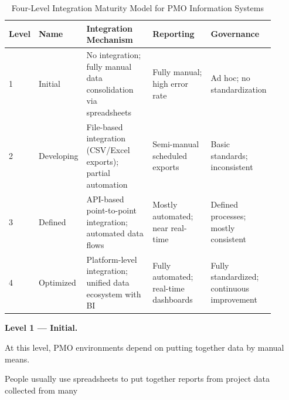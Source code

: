 {\singlespacing 

\begin{table}[h] 

  \caption{Four-Level Integration Maturity Model for PMO Information Systems} 

  \label{tab:imm-levels} 

  \centering 

  \begin{tabular}{p{0.08\linewidth}p{0.15\linewidth}p{0.25\linewidth}p{0.22\linewidth}p{0.20\linewidth}} 

    \toprule 

    \textbf{Level} & \textbf{Name} & \textbf{Integration Mechanism} &  

    \textbf{Reporting} & \textbf{Governance}\\ 

    \midrule 

    1 & Initial & No integration; fully manual data consolidation via spreadsheets &  

    Fully manual; high error rate & Ad hoc; no standardization\\ 

    2 & Developing & File-based integration (CSV/Excel exports); partial automation &  

    Semi-manual scheduled exports & Basic standards; inconsistent\\ 

    3 & Defined & API-based point-to-point integration; automated data flows &  

    Mostly automated; near real-time & Defined processes; mostly consistent\\ 

    4 & Optimized & Platform-level integration; unified data ecosystem with BI &  

    Fully automated; real-time dashboards & Fully standardized; continuous improvement\\ 

    \bottomrule 

  \end{tabular} 

\end{table} 

} 

\textbf{Level 1 --- Initial.}  

At this level, PMO environments depend on putting together data by manual means. 

People usually use spreadsheets to put together reports from project data collected from many 

